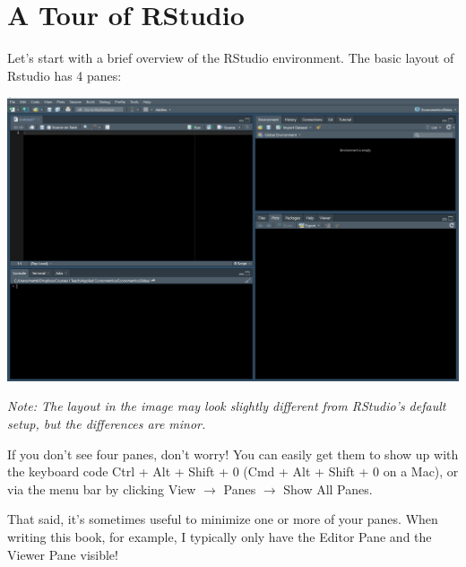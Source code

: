 \documentclass[
  letterpaper,
]{book}
\begin{document}
\section{A Tour of RStudio}\label{a-tour-of-rstudio}

Let's start with a brief overview of the RStudio environment. The basic
layout of Rstudio has 4 panes:

\includegraphics[width=1\linewidth,height=\textheight,keepaspectratio]{images/rstudiopanes.png}

\emph{Note: The layout in the image may look slightly different from
RStudio's default setup, but the differences are minor.}

\begin{tcolorbox}[enhanced jigsaw, colframe=quarto-callout-tip-color-frame, breakable, arc=.35mm, bottomtitle=1mm, bottomrule=.15mm, colbacktitle=quarto-callout-tip-color!10!white, rightrule=.15mm, colback=white, opacityback=0, opacitybacktitle=0.6, coltitle=black, left=2mm, toptitle=1mm, toprule=.15mm, titlerule=0mm, leftrule=.75mm, title=\textcolor{quarto-callout-tip-color}{\faLightbulb}\hspace{0.5em}{Tip from the Helpdesk: Pane Management}]

If you don't see four panes, don't worry! You can easily get them to
show up with the keyboard code Ctrl + Alt + Shift + 0 (Cmd + Alt + Shift
+ 0 on a Mac), or via the menu bar by clicking View \(\rightarrow\)
Panes \(\rightarrow\) Show All Panes.

That said, it's sometimes useful to minimize one or more of your panes.
When writing this book, for example, I typically only have the Editor
Pane and the Viewer Pane visible!

\end{tcolorbox}
\end{document}

